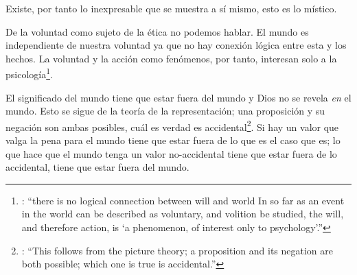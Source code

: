 Existe, por tanto lo inexpresable que se muestra a sí mismo, esto es lo místico.\autocite[Cf.~][\S6.522]{wittgenstein1922tractatuses}

De la voluntad como sujeto de la ética no podemos hablar\autocite[Cf.~][\S6.423]{wittgenstein1922tractatuses}. El mundo es independiente de nuestra voluntad ya que no hay conexión lógica entre esta y los hechos. La voluntad y la acción como fenómenos, por tanto, interesan solo a la psicología\footnote{\cite[cf.~][171]{anscombe1959iwt}: \enquote{there is no logical connection between will and world \textelp{} In so far as an event in the world can be described as voluntary, and volition be studied, the will, and therefore action, is `a phenomenon, of interest only to psychology'.}}.

 El significado del mundo tiene que estar fuera del mundo\autocite[Cf.~][\S6.41]{wittgenstein1922tractatuses} y Dios no se revela \emph{en} el mundo\autocite[Cf.~][\S6.432]{wittgenstein1922tractatuses}. Esto se sigue de la teoría de la representación; una proposición y su negación son ambas posibles, cuál es verdad es accidental\footnote{\cite[Cf.~][170]{anscombe1959iwt}: \enquote{This follows from the picture theory; a proposition and its negation are both possible; which one is true is accidental.}}. Si hay un valor que valga la pena para el mundo tiene que estar fuera de lo que es el caso que es; lo que hace que el mundo tenga un valor no-accidental tiene que estar fuera de lo accidental, tiene que estar fuera del mundo.\autocite[Cf.~][\S6.41]{wittgenstein1922tractatuses}

